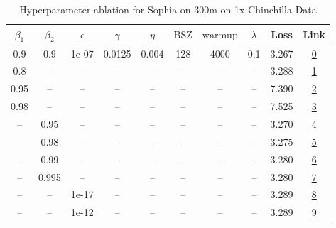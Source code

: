 \begin{table}[H]
\centering
\caption{Hyperparameter ablation for Sophia on 300m on 1x Chinchilla Data}
\label{tab:ablation_sophia_300m_1}
\begin{tabular}{cccccccccc}
\toprule
$\beta_1$ & $\beta_2$ & $\epsilon$ & $\gamma$ & $\eta$ & $\mathrm{BSZ}$ & $\mathrm{warmup}$ & $\lambda$ & Loss & Link \\
\midrule
0.9 & 0.9 & 1e-07 & 0.0125 & 0.004 & 128 & 4000 & 0.1 & 3.267 & \href{https://wandb.ai/stanford-mercury/optimizer-scaling/runs/sweep-300m-6B-sophiafff382flr0.004-wd0.1-minlr0-warmup4000-b10.9-f1648d}{0} \\
\midrule
0.8 & -- & -- & -- & -- & -- & -- & -- & 3.288 & \href{https://wandb.ai/stanford-mercury/optimizer-scaling/runs/sweep-300m-6B-sophiaf8a1eb4lr0.004-wd0.1-minlr0-warmup4000-b10.8-b88dc2}{1} \\
0.95 & -- & -- & -- & -- & -- & -- & -- & 7.390 & \href{https://wandb.ai/stanford-mercury/optimizer-scaling/runs/sweep-300m-6B-sophia727e1alr0.004-wd0.1-minlr0-warmup4000-b10.95-6fbf63}{2} \\
0.98 & -- & -- & -- & -- & -- & -- & -- & 7.525 & \href{https://wandb.ai/stanford-mercury/optimizer-scaling/runs/sweep-300m-6B-sophiaf5a4caalr0.004-wd0.1-minlr0-warmup4000-b10.9-3b3a58}{3} \\
-- & 0.95 & -- & -- & -- & -- & -- & -- & 3.270 & \href{https://wandb.ai/stanford-mercury/optimizer-scaling/runs/sweep-300m-6B-sophiaf5093aclr0.004-wd0.1-minlr0-warmup4000-b10.9-f76ba7}{4} \\
-- & 0.98 & -- & -- & -- & -- & -- & -- & 3.275 & \href{https://wandb.ai/stanford-mercury/optimizer-scaling/runs/sweep-300m-6B-sophiaqd032adlr0.004-wd0.1-minlr0-warmup4000-b10.9-2f3128}{5} \\
-- & 0.99 & -- & -- & -- & -- & -- & -- & 3.280 & \href{https://wandb.ai/stanford-mercury/optimizer-scaling/runs/sweep-300m-6B-sophiaff4bc42lr0.004-wd0.1-minlr0-warmup4000-b10.9-3cffe0}{6} \\
-- & 0.995 & -- & -- & -- & -- & -- & -- & 3.280 & \href{https://wandb.ai/stanford-mercury/optimizer-scaling/runs/sweep-300m-6B-sophiaf602b10lr0.004-wd0.1-minlr0-warmup4000-b10.9-9d3420}{7} \\
-- & -- & 1e-17 & -- & -- & -- & -- & -- & 3.289 & \href{https://wandb.ai/stanford-mercury/optimizer-scaling/runs/sweep-300m-6B-sophia145319lr0.004-wd0.1-minlr0-warmup4000-b10.9--aa98b0}{8} \\
-- & -- & 1e-12 & -- & -- & -- & -- & -- & 3.289 & \href{https://wandb.ai/stanford-mercury/optimizer-scaling/runs/sweep-300m-6B-sophiaf6afd56lr0.004-wd0.1-minlr0-warmup4000-b10.9-c96ddc}{9} \\

\end{tabular}
\end{table}
